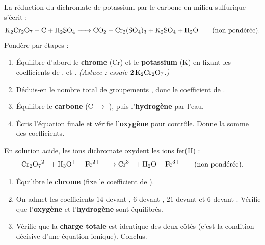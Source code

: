 \documentclass[11pt,a4paper]{article}
\begin{document}
\begin{exo}
La réduction du dichromate de potassium par le carbone en milieu sulfurique s'écrit :
\[ \ce{K2Cr2O7 + C + H2SO4 -> CO2 + Cr2(SO4)3 + K2SO4 + H2O}\qquad\text{(non pondérée).} \]
Pondère par étapes :
\begin{enumerate}[label=\textbf{\alph*)},leftmargin=2em,topsep=1pt,itemsep=1.5pt]
  \item Équilibre d'abord le \textbf{chrome} (Cr) et le \textbf{potassium} (K) en fixant les
        coefficients de ,  et . \emph{(Astuce : essaie
        $2\,\ce{K2Cr2O7}$.)}
  \item Déduis-en le nombre total de groupements \textbf{}, donc le coefficient de .
  \item Équilibre le \textbf{carbone} (C $\to$ ), puis l'\textbf{hydrogène} par l'eau.
  \item Écris l'équation finale et vérifie l'\textbf{oxygène} pour contrôle. Donne la somme des coefficients.
\end{enumerate}
\end{exo}

\begin{exo}
En solution acide, les ions dichromate oxydent les ions fer(II) :
\[ \ce{Cr2O7^2- + H3O+ + Fe^2+ -> Cr^3+ + H2O + Fe^3+}\qquad\text{(non pondérée).} \]
\begin{enumerate}[label=\textbf{\alph*)},leftmargin=2em,topsep=1pt,itemsep=1.5pt]
  \item Équilibre le \textbf{chrome} (fixe le coefficient de ).
  \item On admet les coefficients $14$ devant , $6$ devant , $21$ devant 
        et $6$ devant . Vérifie que l'\textbf{oxygène} et l'\textbf{hydrogène} sont équilibrés.
  \item Vérifie que la \textbf{charge totale} est identique des deux côtés (c'est la condition décisive
        d'une équation ionique). Conclus.
\end{enumerate}
\end{exo}
\end{document}
